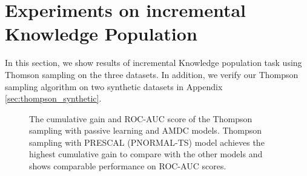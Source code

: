 
\section{Experiments on incremental\\ Knowledge Population}
\label{sec:exp2}

In this section, we show results of incremental Knowledge population task using Thomson sampling on the three datasets. In addition, we verify our Thompson sampling algorithm on two synthetic datasets in Appendix \ref{sec:thompson_synthetic}.

\begin{figure}[t]
	\centering

	\caption{\label{fig:vs_greedy} The cumulative gain and ROC-AUC score of the Thompson sampling with passive learning and  AMDC models. Thompson sampling with PRESCAL (\textsc{PNORMAL-TS}) model achieves the highest cumulative gain to compare with the other models and shows comparable performance on ROC-AUC scores.}
\end{figure}

